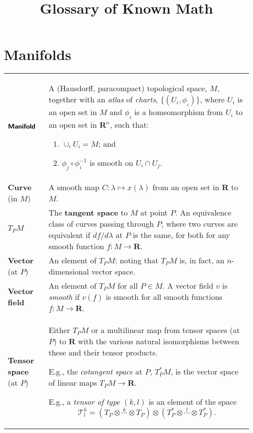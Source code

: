 \documentclass[10pt, a4paper, twocolumn]{article}
\title{Glossary of Known Math}
\date{}
\author{}
\newcommand{\defn}[1]{\textbf{\textsf{#1}}}
\newcommand{\set}[1]{\mathbold{#1}}
\newcommand{\reals}{\set{R}}
\begin{document}
\addtolength{}%
\addtolength{}%
\maketitle
\section*{Manifolds}
\begin{tabularx}{\columnwidth}{@{}p{}>{\raggedright\arraybackslash}X@{}}
  \toprule
  $\defn{Manifold}$ & A (Hausdorff, paracompact) topological space, $M$, together with an \emph{atlas} of \emph{charts}, $\{(U_i, \phi_i)\}$, where $U_i$ is an open set in $M$ and $\phi_i$ is a homeomorphism from $U_i$ to an open set in $\reals^n$, such that:
  \begin{enumerate}
  \item $\cup_i U_i = M$; and
  \item $\phi_j \circ \phi_i^{-1}$ is smooth on $U_i \cap U_j$.
  \end{enumerate} \\

  \defn{Curve} (in $M$) & A smooth map $C:\lambda \mapsto x(\lambda)$ from an open set in $\reals$ to $M$. \\

  $T_P M$ & The \defn{tangent space} to $M$ at point $P$. An equivalence class of curves passing through $P$, where two curves are equivalent if $df/d\lambda$ at $P$ is the same, for both for any smooth function $f:M \to \reals$. \\

  \defn{Vector} (at $P$) & An element of $T_P M$; noting that $T_P M$ is, in fact, an $n$-dimensional vector space.\\

  \defn{Vector field} & An element of $T_P M$ for all $P\in M$. A vector field $v$ is \emph{smooth} if $v(f)$ is smooth for all smooth functions $f:M\to\reals$. \\
  
  \defn{Tensor space} (at $P$) & Either $T_P M$ or a multilinear map from tensor spaces (at $P$) to $\reals$ with the various natural isomorphisms between these and their tensor products.

  E.g., the \emph{cotangent space} at $P$, $T^*_P M$, is the vector space of linear maps $T_P M\to\reals$.

  E.g., a \emph{tensor of type $(k, l)$} is an element of the space
  \begin{equation*}
    \mathscr{T}^k_l = (T_P \otimes \overset{k}{\dotsb} \otimes T_P) \otimes (T^*_P \otimes \overset{l}{\dotsb} \otimes T^*_P).  
  \end{equation*} \\
\end{tabularx}
\end{document}
